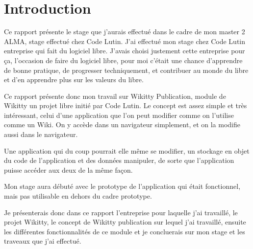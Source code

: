 \section*{Introduction}

Ce rapport présente le stage que j'aurais effectué dans le cadre de mon master 2
ALMA, stage effectué chez Code Lutin. J'ai effectué mon stage chez Code Lutin
entreprise qui fait du logiciel libre. J'avais choisi justement cette entreprise
pour ça, l'occasion de faire du logiciel libre, pour moi c'était une chance 
d'apprendre de bonne pratique, de progresser techniquement, et contribuer au 
monde du libre et d'en apprendre plus sur les valeurs du libre.

Ce rapport présente donc mon travail sur Wikitty Publication, module de Wikitty
un projet libre initié par Code Lutin. Le concept est assez simple et très 
intéressant, celui d'une application que l'on peut modifier comme on l'utilise
comme un Wiki. On y accède dans un navigateur simplement, et on la modifie aussi
dans le navigateur.

Une application qui du coup pourrait elle même se modifier, un stockage en objet
du code de l'application et des données manipuler, de sorte que l'application 
puisse accéder aux deux de la même façon. 

Mon stage aura débuté avec le prototype de l'application qui était fonctionnel,
mais pas utilisable en dehors du cadre prototype.

Je présenterais donc dans ce rapport l'entreprise pour laquelle j'ai travaillé,
le projet Wikitty, le concept de Wikitty publication sur lequel j'ai travaillé,
ensuite les différentes fonctionnalités de ce module et je concluerais sur mon 
stage et les traveaux que j'ai effectué.

